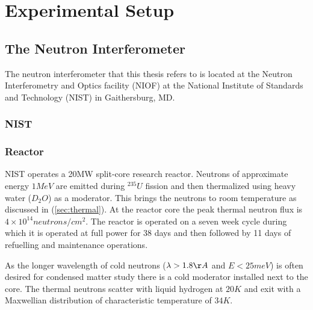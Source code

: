 
\chapter{Experimental Setup} %
\label{Chapter4}


\section{The Neutron Interferometer}
The neutron interferometer that this thesis refers to is located at the Neutron Interferometry and Optics facility (NIOF) at the National Institute of Standards and Technology (NIST) in Gaithersburg, MD. 
\subsection{NIST}
\subsection{Reactor}
NIST operates a 20MW split-core research reactor. Neutrons of approximate energy $1 MeV$ are emitted during $^{235}U$ fission and then thermalized using heavy water ($D_2O$) as a moderator. This brings the neutrons to room temperature as discussed in (\ref{sec:thermal}). At the reactor core the peak thermal neutron flux is $4\times 10^{14} neutrons/cm^2$. The reactor is operated on a seven week cycle during which it is operated at full power for 38 days and then followed by 11 days of refuelling and maintenance operations. 

As the longer wavelength of cold neutrons ($\lambda>1.8\AA$ and $E<25meV$) is often desired for condensed matter study there is a cold moderator installed next to the core. The thermal neutrons scatter with liquid hydrogen at $20K$ and exit with a Maxwellian distribution of characteristic temperature of $34K$. 

